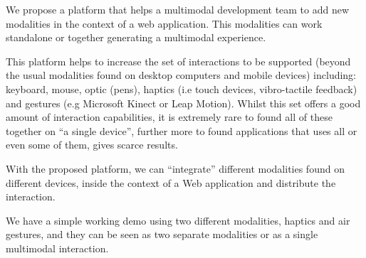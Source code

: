 \documentclass{llncs}
\begin{document}
We propose a platform that helps a multimodal development team to add new modalities in the context of a web application. This modalities can work standalone or together generating a multimodal experience. 

This platform helps to increase the set of interactions to be supported (beyond the usual modalities found on desktop computers and mobile devices) including: keyboard, mouse, optic (pens), haptics (i.e touch devices, vibro-tactile feedback) and gestures (e.g Microsoft Kinect or Leap Motion). Whilst this set offers a good amount of interaction capabilities, it is extremely rare to found all of these together on ``a single device'', further more to found applications that uses all or even some of them, gives scarce results. 

With the proposed platform, we can ``integrate'' different modalities found on different devices, inside the context of a Web application and distribute the interaction. 

We have a simple working demo using two different modalities, haptics and air gestures, and they can be seen as two separate modalities or as a single multimodal interaction.

\end{document}
